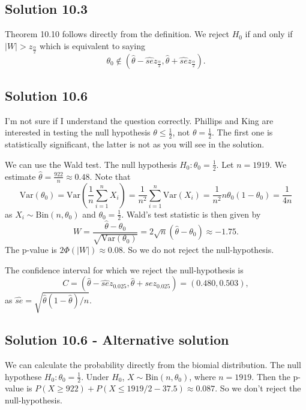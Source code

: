\subsection*{Solution 10.3}

Theorem 10.10 follows directly from the definition.
We reject $H_0$ if and only if $|W| > z_{\frac{\alpha}{2}}$ which is equivalent to saying
\begin{equation*}
    \theta_0 \notin (\hat{\theta} - \hat{se} z_{\frac{\alpha}{2}}, \hat{\theta} + \hat{se} z_{\frac{\alpha}{2}}).
\end{equation*}
\subsection*{Solution 10.6}

I'm not sure if I understand the question correctly.
Phillips and King are interested in testing the null hypothesis $\theta \leq \frac{1}{2}$, not $\theta = \frac{1}{2}$.
The first one is statistically significant, the latter is not as you will see in the solution.

We can use the Wald test.
The null hypothesis $H_0: \theta_0 = \frac{1}{2}$.
Let $n = 1919$.
We estimate $\hat{\theta} = \frac{922}{n} \approx 0.48$.
Note that
$$
\mathrm{Var}(\theta_0)
    = \mathrm{Var}(\frac{1}{n} \sum_{i=1}^n X_i)
    = \frac{1}{n^2} \sum_{i=1}^n \mathrm{Var}(X_i)
    = \frac{1}{n^2} n \theta_0 (1 - \theta_0)
    = \frac{1}{4n}
$$
as $X_i \sim \mathrm{Bin}(n, \theta_0)$ and $\theta_0 = \frac{1}{2}$.
Wald's test statistic is then given by
$$
W = \frac{\hat{\theta} - \theta_0}{\sqrt{\mathrm{Var}(\theta_0)}}
    = 2\sqrt{n} (\hat{\theta} - \theta_0)
    \approx -1.75.
$$
The p-value is $2\Phi(|W|) \approx 0.08$.
So we do not reject the null-hypothesis.

The confidence interval for which we reject the null-hypothesis is
$$
C = (\hat{\theta} - \hat{se} z_{0.025}, \hat{\theta} + \hat{se} z_{0.025})
    = (0.480, 0.503),
$$
as $\hat{se} = \sqrt{\hat{\theta}(1 - \hat{\theta})/n}$.

\subsection*{Solution 10.6 - Alternative solution}

We can calculate the probability directly from the biomial distribution.
The null hypothese $H_0: \theta_0 = \frac{1}{2}$.
Under $H_0$, $X \sim \mathrm{Bin}(n, \theta_0)$, where $n = 1919$.
Then the p-value is $P(X \geq 922) + P(X \leq 1919/2 - 37.5) \approx 0.087$.
So we don't reject the null-hypothesis.

